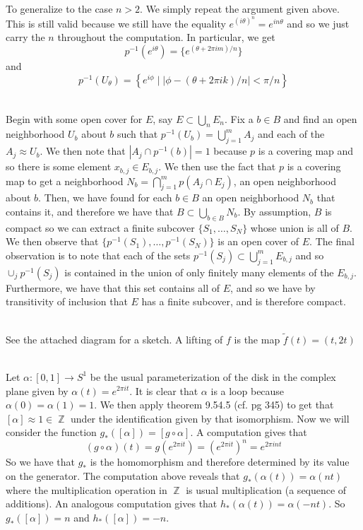 \documentclass{article}
\DeclareMathOperator{\Z}{\mathbb{Z}}
\DeclareMathOperator{\suchthat}{\mathrel{|}}
\newcommand{\problem}[1]{\noindent{\textbf{Problem #1}}\\}
\newcommand{\problempart}[1]{\noindent{\textbf{(#1)}}}
\begin{document}
To generalize to the case $n > 2$. We simply repeat the argument given above. This is still valid because we still have the equality $e^{(i\theta)^n} = e^{in\theta}$ and so we just carry the $n$ throughout the computation. In particular, we get
\[
p^{-1}(e^{i\theta}) = \{e^{(\theta + 2\pi im)/n}\}
\]
and 
\[
p^{-1}(U_{\theta}) = \left\{ e^{i\phi} \suchthat \left|\phi - (\theta + 2\pi ik)/n\right| < \pi / n\right\}
\]

\problem{9.53.6}
\problempart{b} Begin with some open cover for $E$, say $E \subset \bigcup_n E_n$. Fix a $b \in B$ and find an open neighborhood $U_b$ about $b$ such that $p^{-1}(U_b) = \bigcup_{j=1}^m A_j$ and each of the $A_j \approx U_b$. We then note that $|A_j \cap p^{-1}(b)| = 1$ because $p$ is a covering map and so there is some element $x_{b,j} \in E_{b,j}$. We then use the fact that $p$ is a covering map to get a neighborhood $N_b = \bigcap_{j=1}^m p(A_j \cap E_j)$, an open neighborhood about $b$. Then, we have found for each $b \in B$ an open neighborhood $N_b$ that contains it, and therefore we have that $B \subset \bigcup_{b \in B} N_b$. By assumption, $B$ is compact so we can extract a finite subcover $\{S_1, \ldots, S_N\}$ whose union is all of $B$. We then observe that $\{p^{-1}(S_1), \ldots, p^{-1}(S_N)\}$ is an open cover of $E$. The final observation is to note that each of the sets $p^{-1}(S_j) \subset \bigcup_{j=1}^m E_{b,j}$ and so $\cup_j p^{-1}(S_j)$ is contained in the union of only finitely many elements of the $E_{b,j}$. Furthermore, we have that this set contains all of $E$, and so we have by transitivity of inclusion that $E$ has a finite subcover, and is therefore compact. 

\problem{9.54.5} See the attached diagram for a sketch. A lifting of $f$ is the map $\tilde{f}(t) = (t,2t)$

\problem{9.54.6} Let $\alpha: [0,1] \to S^1$ be the usual parameterization of the disk in the complex plane given by $\alpha(t) = e^{2\pi it}$. It is clear that $\alpha$ is a loop because $\alpha (0) = \alpha(1) = 1$. We then apply theorem 9.54.5 (cf. pg 345) to get that $[\alpha] \approx 1 \in \Z$ under the identification given by that isomorphism. Now we will consider the function $g_*([\alpha]) = [g \circ \alpha]$. A computation gives that
\[
(g \circ \alpha)(t) = g(e^{2\pi it}) = (e^{2\pi it})^n = e^{2\pi int}
\]
So we have that $g_*$ is the homomorphism and therefore determined by its value on the generator. The computation above reveals that $g_*(\alpha(t)) = \alpha(nt)$ where the multiplication operation in $\Z$ is usual multiplication (a sequence of additions). An analogous computation gives that $h_*(\alpha(t)) = \alpha(-nt)$. So $g_*([\alpha]) = n$ and $h_*([\alpha]) = -n$. 
\end{document}
